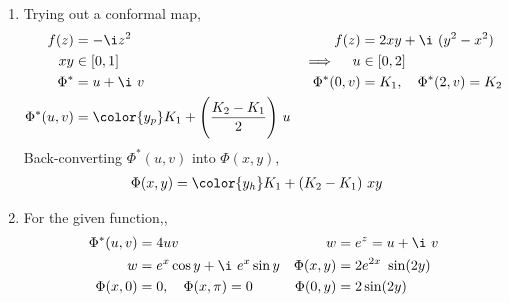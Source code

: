 \begin{enumerate}
    \item Trying out a conformal map,
          \begin{align}
              f(z)             & = -\i z^2                                     &
              f(z)             & = 2xy + \i\ (y^2 - x^2)                         \\
              xy               & \in [0, 1]                                    &
              \implies \quad u & \in [0, 2]                                      \\
              \Phi^*           & = u + \i\ v                                   &
              \Phi^*(0, v)     & = K_1, \quad \Phi^*(2, v) = K_2                 \\
              \Phi^*(u, v)     & = \color{y_p} K_1 + \Bigg(\frac{K_2 - K_1}{2}
              \Bigg)\ u
          \end{align}
          Back-converting $ \Phi^*(u, v) $ into $ \Phi(x, y) $,
          \begin{align}
              \Phi(x, y) & = \color{y_h} K_1 + (K_2 - K_1)\ xy
          \end{align}

    \item For the given function,,
          \begin{align}
              \Phi^*(u, v) & = 4uv                         &
              w            & = e^z = u + \i\ v               \\
              w            & = e^x \cos y + \i\ e^x \sin y &
              \Phi(x, y)   & = 2e^{2x}\ \sin(2y)             \\
              \Phi(x, 0)   & = 0, \quad \Phi(x, \pi) = 0   &
              \Phi(0, y)   & = 2\sin(2y)
          \end{align}


\end{enumerate}

